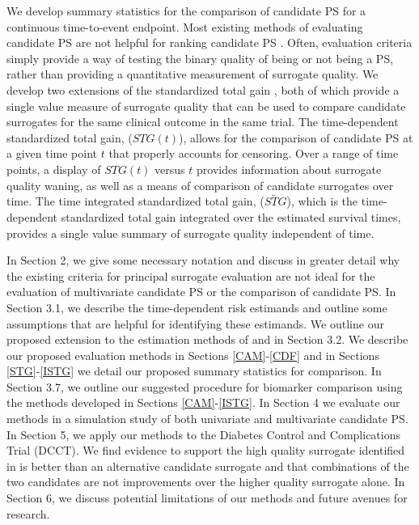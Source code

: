 \documentclass[times, doublespace]{simauth}
\begin{document}
We develop summary statistics for the comparison of candidate PS for a continuous time-to-event endpoint. Most existing methods of evaluating candidate PS are not helpful for ranking candidate PS . Often, evaluation criteria simply provide a way of testing the binary quality of being or not being a PS, rather than providing a quantitative measurement of surrogate quality. We develop two extensions of the standardized total gain \citep{Huang11}, both of which provide a single value measure of surrogate quality that can be used to compare candidate surrogates for the same clinical outcome in the same trial. The time-dependent standardized total gain, ($STG(t)$), allows for the comparison of candidate PS at a given time point $t$ that properly accounts for censoring. Over a range of time points, a display of $STG(t)$ versus $t$ provides information about surrogate quality waning, as well as a means of comparison of candidate surrogates over time. The time integrated  standardized total gain, ($\widetilde{STG}$), which is the time-dependent standardized total gain integrated over the estimated survival times, provides a single value summary of surrogate quality independent of time. 

In Section 2, we give some necessary notation and discuss in greater detail why the existing criteria for principal surrogate evaluation are not ideal for the evaluation of multivariate candidate PS or the comparison of candidate PS.  In Section 3.1, we describe the time-dependent risk estimands and outline some assumptions that are helpful for identifying these estimands.  We outline our proposed extension to the estimation methods of \citet{Huang11} and \citet{Gabriel13} in Section 3.2.  We describe our proposed evaluation methods in Sections \ref{CAM}-\ref{CDF} and in Sections \ref{STG}-\ref{ISTG} we detail our proposed summary statistics for comparison. In Section 3.7, we outline our suggested procedure for biomarker comparison using the methods developed in Sections \ref{CAM}-\ref{ISTG}. In Section 4 we evaluate our methods in a simulation study of both univariate and multivariate candidate PS. In Section 5, we apply our methods to the Diabetes Control and Complications Trial (DCCT). We find evidence to support the high quality surrogate identified in \citet{Gabriel13} is better than an alternative candidate surrogate and that combinations of the two candidates are not improvements over the higher quality surrogate alone. In Section 6, we discuss potential limitations of our methods and future avenues for research. 
\end{document}
